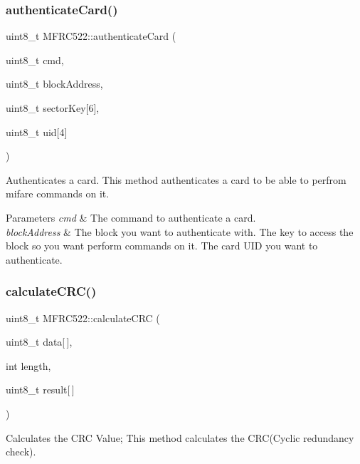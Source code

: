 \subsubsection{\texorpdfstring{authenticate\+Card()}{authenticateCard()}}
{\footnotesize\ttfamily uint8\+\_\+t M\+F\+R\+C522\+::authenticate\+Card (\begin{DoxyParamCaption}\item[{uint8\+\_\+t}]{cmd,  }\item[{uint8\+\_\+t}]{block\+Address,  }\item[{uint8\+\_\+t}]{sector\+Key\mbox{[}6\mbox{]},  }\item[{uint8\+\_\+t}]{uid\mbox{[}4\mbox{]} }\end{DoxyParamCaption})}



Authenticates a card.  This method authenticates a card to be able to perfrom mifare commands on it. 


\begin{DoxyParams}{Parameters}
{\em cmd} & The command to authenticate a card. \\
\hline
{\em block\+Address} & The block you want to authenticate with.  The key to access the block so you want perform commands on it.  The card U\+ID you want to authenticate. \\
\hline
\end{DoxyParams}
\mbox{\label{classMFRC522_af63a4a15c8752ca8d032ffe2a1120370}} 
\subsubsection{\texorpdfstring{calculate\+C\+R\+C()}{calculateCRC()}}
{\footnotesize\ttfamily uint8\+\_\+t M\+F\+R\+C522\+::calculate\+C\+RC (\begin{DoxyParamCaption}\item[{uint8\+\_\+t}]{data\mbox{[}$\,$\mbox{]},  }\item[{int}]{length,  }\item[{uint8\+\_\+t}]{result\mbox{[}$\,$\mbox{]} }\end{DoxyParamCaption})}



Calculates the C\+RC Value;  This method calculates the C\+R\+C(\+Cyclic redundancy check). 


